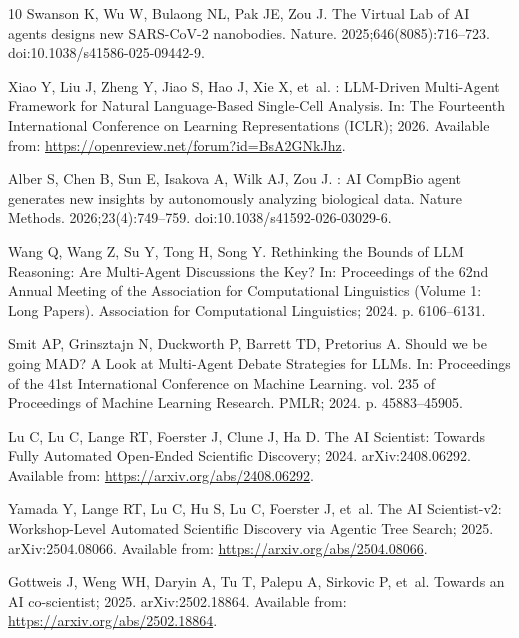 \documentclass[10pt,letterpaper]{article}
\begin{document}
\begin{thebibliography}{10}
Swanson K, Wu W, Bulaong NL, Pak JE, Zou J.
\newblock The {Virtual Lab} of {AI} agents designs new {SARS-CoV-2} nanobodies.
\newblock Nature. 2025;646(8085):716--723.
\newblock doi:{10.1038/s41586-025-09442-9}.

Xiao Y, Liu J, Zheng Y, Jiao S, Hao J, Xie X, et~al.
: {LLM}-Driven Multi-Agent Framework for Natural
  Language-Based Single-Cell Analysis.
\newblock In: The Fourteenth International Conference on Learning
  Representations (ICLR); 2026. Available from:
  \url{https://openreview.net/forum?id=BsA2GNkJhz}.

Alber S, Chen B, Sun E, Isakova A, Wilk AJ, Zou J.
: {AI} {CompBio} agent generates new insights by
  autonomously analyzing biological data.
\newblock Nature Methods. 2026;23(4):749--759.
\newblock doi:{10.1038/s41592-026-03029-6}.

Wang Q, Wang Z, Su Y, Tong H, Song Y.
\newblock Rethinking the Bounds of {LLM} Reasoning: Are Multi-Agent Discussions
  the Key?
\newblock In: Proceedings of the 62nd Annual Meeting of the Association for
  Computational Linguistics (Volume 1: Long Papers). Association for
  Computational Linguistics; 2024. p. 6106--6131.

Smit AP, Grinsztajn N, Duckworth P, Barrett TD, Pretorius A.
\newblock Should we be going {MAD}? {A} Look at Multi-Agent Debate Strategies
  for {LLMs}.
\newblock In: Proceedings of the 41st International Conference on Machine
  Learning. vol. 235 of Proceedings of Machine Learning Research. PMLR; 2024.
  p. 45883--45905.

Lu C, Lu C, Lange RT, Foerster J, Clune J, Ha D. The {AI} {Scientist}: Towards
  Fully Automated Open-Ended Scientific Discovery; 2024.
\newblock arXiv:2408.06292.
\newblock Available from: \url{https://arxiv.org/abs/2408.06292}.

Yamada Y, Lange RT, Lu C, Hu S, Lu C, Foerster J, et~al. The {AI}
  {Scientist-v2}: Workshop-Level Automated Scientific Discovery via Agentic
  Tree Search; 2025.
\newblock arXiv:2504.08066.
\newblock Available from: \url{https://arxiv.org/abs/2504.08066}.

Gottweis J, Weng WH, Daryin A, Tu T, Palepu A, Sirkovic P, et~al. Towards an
  {AI} co-scientist; 2025.
\newblock arXiv:2502.18864.
\newblock Available from: \url{https://arxiv.org/abs/2502.18864}.


\end{thebibliography}
\end{document}
